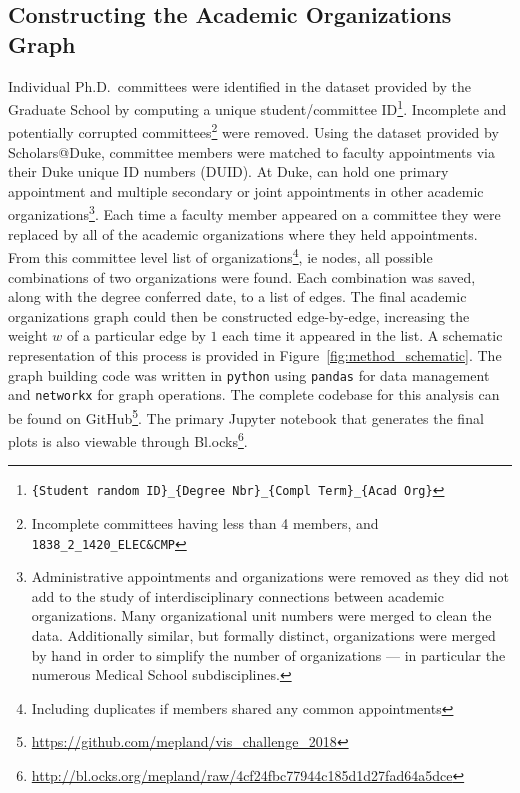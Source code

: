 \documentclass[notitlepage,aps,prd,nofootinbib]{revtex4-1}
\begin{document}
\subsection{Constructing the Academic Organizations Graph}
\label{sec:construct_graph}
Individual Ph.D.\ committees were identified in the  dataset provided by the Graduate School by computing a unique student/committee ID\footnote{\texttt{\{Student random ID\}\_\{Degree Nbr\}\_\{Compl Term\}\_\{Acad Org\}}}. Incomplete and potentially corrupted committees\footnote{Incomplete committees having less than 4 members, and \texttt{1838\_2\_1420\_ELEC\&CMP}} were removed. Using the  dataset provided by Scholars@Duke, committee members were matched to faculty appointments via their Duke unique ID numbers (DUID). At Duke, can hold one primary appointment and multiple secondary or joint appointments in other academic organizations\footnote{Administrative appointments and organizations were removed as they did not add to the study of interdisciplinary connections between academic organizations. Many organizational unit numbers were merged to clean the data. Additionally similar, but formally distinct, organizations were merged by hand in order to simplify the number of organizations --- in particular the numerous Medical School subdisciplines.}. Each time a faculty member appeared on a committee they were replaced by all of the academic organizations where they held appointments. From this committee level list of organizations\footnote{Including duplicates if members shared any common appointments}, ie nodes, all possible combinations of two organizations were found. Each combination was saved, along with the degree conferred date, to a list of edges. The final academic organizations graph could then be constructed edge-by-edge, increasing the weight $w$ of a particular edge by $1$ each time it appeared in the list. A schematic representation of this process is provided in Figure~\ref{fig:method_schematic}. The graph building code was written in \texttt{python} using \texttt{pandas} \cite{pandas} for data management and \texttt{networkx} \cite{networkx} for graph operations. The complete codebase for this analysis can be found on GitHub\footnote{\url{https://github.com/mepland/vis_challenge_2018}}. The primary Jupyter notebook that generates the final plots is also viewable through Bl.ocks\footnote{\url{http://bl.ocks.org/mepland/raw/4cf24fbc77944c185d1d27fad64a5dce}}.
\end{document}
